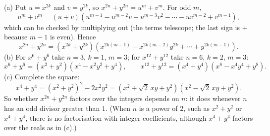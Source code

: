 (a) Put $u=x^{2k}$ and $v=y^{2k}$, so $x^{2n}+y^{2n}=u^m+v^m$. For odd $m$,
\[
u^m+v^m=(u+v)\left(u^{m-1}-u^{m-2}v+u^{m-3}v^2-\cdots-uv^{m-2}+v^{m-1}\right),
\]
which can be checked by multiplying out (the terms telescope; the last sign is $+$ because $m-1$ is even). Hence
\[
x^{2n}+y^{2n}=\left(x^{2k}+y^{2k}\right)\left(x^{2k(m-1)}-x^{2k(m-2)}y^{2k}+\cdots+y^{2k(m-1)}\right).
\]
(b) For $x^6+y^6$ take $n=3$, $k=1$, $m=3$; for $x^{12}+y^{12}$ take $n=6$, $k=2$, $m=3$:
\[
x^6+y^6=\left(x^2+y^2\right)\left(x^4-x^2y^2+y^4\right),\qquad x^{12}+y^{12}=\left(x^4+y^4\right)\left(x^8-x^4y^4+y^8\right).
\]
(c) Complete the square:
\[
x^4+y^4=\left(x^2+y^2\right)^2-2x^2y^2=\left(x^2+\sqrt2\,xy+y^2\right)\left(x^2-\sqrt2\,xy+y^2\right).
\]
So whether $x^{2n}+y^{2n}$ factors over the integers depends on $n$: it does whenever $n$ has an odd divisor greater than $1$. (When $n$ is a power of $2$, such as $x^2+y^2$ or $x^4+y^4$, there is no factorisation with integer coefficients, although $x^4+y^4$ factors over the reals as in (c).)
